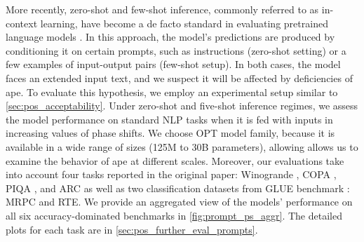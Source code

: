 \documentclass[letterpaper, 12pt]{report}
\begin{document}
More recently, zero-shot and few-shot inference, commonly referred to as in-context learning, have become a de facto standard in evaluating pretrained language models \citep{Brown2020:GPT3}.
In this approach, the model's predictions are produced by conditioning it on certain prompts, such as instructions (zero-shot setting) or a few examples of input-output pairs (few-shot setup).
In both cases, the model faces an extended input text, and we suspect it will be affected by deficiencies of \acrshort{ape}.
To evaluate this hypothesis, we employ an experimental setup similar to \autoref{sec:pos_acceptability}.
Under zero-shot and five-shot inference regimes, we assess the model performance on standard NLP tasks when it is fed with inputs in increasing values of phase shifts.
We choose OPT model family, because it is available in a wide range of sizes (125M to 30B parameters), allowing allows us to examine the behavior of \acrshort{ape} at different scales.
Moreover, our evaluations take into account four tasks reported in the original paper: Winogrande \citep{Sakaguchi2020:WINOGRANDE}, COPA \citep{Gordon2012:COPA}, PIQA \citep{Bisk2020:PIQA}, and ARC \citep{Clark2018:ARC} as well as two classification datasets from GLUE benchmark \citep{wang-etal-2018-glue}: MRPC and RTE.
We provide an aggregated view of the models' performance on all six accuracy-dominated benchmarks in \autoref{fig:prompt_ps_aggr}. The detailed plots for each task are in \autoref{sec:pos_further_eval_prompts}.
\end{document}
